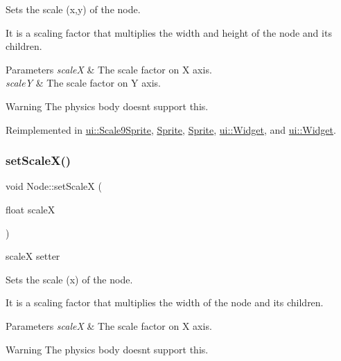 Sets the scale (x,y) of the node.

It is a scaling factor that multiplies the width and height of the node and its children.


\begin{DoxyParams}{Parameters}
{\em scaleX} & The scale factor on X axis. \\
\hline
{\em scaleY} & The scale factor on Y axis.\\
\hline
\end{DoxyParams}
\begin{DoxyWarning}{Warning}
The physics body doesn\textquotesingle{}t support this. 
\end{DoxyWarning}


Reimplemented in \hyperlink{classui_1_1Scale9Sprite_a5c98e355992ab8f4e4cfc2f4eac8e104}{ui\+::\+Scale9\+Sprite}, \hyperlink{classSprite_a52e1d2937d38baf4ad067f029e33b901}{Sprite}, \hyperlink{classSprite_aa91d58969ba99f1bfd3ade56bda6fc5c}{Sprite}, \hyperlink{classui_1_1Widget_a2ff6617263887b25fdb0ac06ac94f31a}{ui\+::\+Widget}, and \hyperlink{classui_1_1Widget_ace618234c5e35f66a9c569027cc9c5cf}{ui\+::\+Widget}.

\mbox{\label{classNode_acf7f04074f7f49972e152788c090b877}} 
\subsubsection{\texorpdfstring{set\+Scale\+X()}{setScaleX()}\hspace{0.1cm}{\footnotesize\ttfamily [1/2]}}
{\footnotesize\ttfamily void Node\+::set\+ScaleX (\begin{DoxyParamCaption}\item[{float}]{scaleX }\end{DoxyParamCaption})\hspace{0.3cm}{\ttfamily [virtual]}}



scaleX setter 

Sets the scale (x) of the node.

It is a scaling factor that multiplies the width of the node and its children.


\begin{DoxyParams}{Parameters}
{\em scaleX} & The scale factor on X axis.\\
\hline
\end{DoxyParams}
\begin{DoxyWarning}{Warning}
The physics body doesn\textquotesingle{}t support this. 
\end{DoxyWarning}


